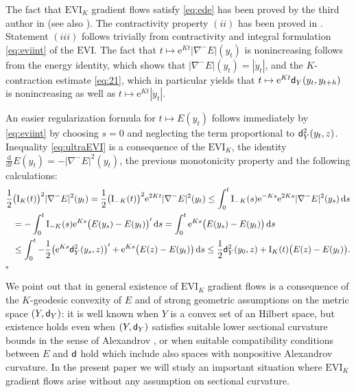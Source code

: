 \documentclass[reqno,11pt]{article}
\numberwithin{equation}{section}
\newcommand{\sfd}{{\sf d}}
\newcommand{\rme}{{\mathrm e}}
\renewcommand{\d}{{\mathrm d}}
\newcommand{\dt}{{\d t}}
\newcommand{\EVI}[4]{\mathrm{EVI}_{#4}(#1,{#2}_W,#3)}
\newenvironment{proof}{\removelastskip\par\medskip   %
\noindent{\em Proof.}
\rm}{\penalty-20\null\hfill$\square$\par\medbreak}
\renewcommand{\EVI}{\ensuremath{\mathrm{EVI}}}
\begin{document}
\begin{proof}
The fact that $\EVI_K$ gradient flows satisfy \eqref{eq:ede} has
been proved by the third author in \cite{Savare10} (see also
\cite[Proposition~3.9]{Ambrosio-Gigli11}). The contractivity
property $(ii)$ has been proved in
\cite[Chap.~4]{Ambrosio-Gigli-Savare08}. Statement $(iii)$ follows
trivially from contractivity and integral formulation
\eqref{eq:eviint} of the $\EVI$. The fact that $t\mapsto \rme^{K
t}|\nabla^- E|(y_t)$ is nonincreasing follows from the energy
identity, which shows that $|\nabla^- E|(y_t)=|\dot y_t|$, and the
$K$-contraction estimate \eqref{eq:21}, which in particular yields
that $t\mapsto \rme^{Kt}\sfd_Y(y_t,y_{t+h})$ is nonincreasing as
well as $t\mapsto \rme^{Kt}|\dot y_t|$.

An easier regularization formula for $t\mapsto E(y_t)$ follows
immediately by \eqref{eq:eviint} by choosing $s=0$ and neglecting
the term proportional to $\sfd_Y^2(y_t,z)$. Inequality
\eqref{eq:ultraEVI} is a consequence of the $\EVI_K$, the identity
$\frac\d{\dt}E(y_t)=-|\nabla^- E|^2(y_t)$, the previous monotonicity
property and the following calculations:
  \begin{align*}
    \frac 12&\big(\mathrm I_K(t)\big)^2|\nabla^-E|^2(y_t)
    =\frac12\big(\mathrm I_{-K}(t)\big)^2\rme^{2 K t}|\nabla^- E|^2(y_t)
    \le
    \int_0^t \mathrm I_{-K}(s) \rme^{-K s}
    \rme^{2K s}|\nabla^- E|^2(y_s)\,\d s
    \\&
    =-\int_0^t  \mathrm I_{-K}( s) \rme^{K s}
    \big(E(y_s)-E(y_t)\big)'\,\d s
    =
    \int_0^t \rme^{K s}\big(E(y_s)-E(y_t)\big)\,\d s
    \\&\le
    \int_0^t -\frac 12\big(\rme^{K s}\sfd^2_Y(y_s,z)\big)'
    +\rme^{K s}\big(E(z)-E(y_t)\big)\,\d s
    \le
    \frac 12\sfd^2_Y(y_0,z)+\mathrm I_K(t)\big(E(z)-E(y_t)\big).
  \end{align*}
\end{proof}

We point out that in general existence of $\EVI_K$ gradient flows is
a consequence of the $K$-geodesic convexity of $E$ and of strong
geometric assumptions on the metric space $(Y,\sfd_Y)$: it is well
known when $Y$ is a convex set of an Hilbert space, but existence
holds even when $(Y,\sfd_Y)$ satisfies suitable lower sectional
curvature bounds in the sense of Alexandrov
\cite{Gigli-Ohta10,Ohta09,Savare07,Savare10}, or when suitable
compatibility conditions between $E$ and $\sfd$ hold
\cite[Chapter~4]{Ambrosio-Gigli-Savare08} which include also spaces
with nonpositive Alexandrov curvature. In the present paper we will
study an important situation where $\EVI_K$ gradient flows arise
without any assumption on sectional curvature.
\end{document}
